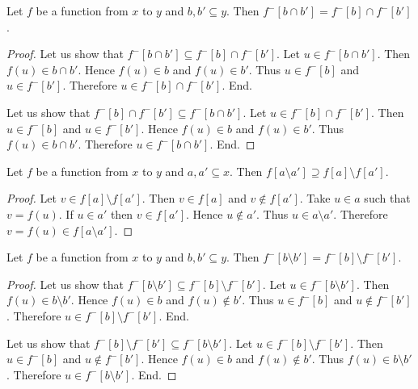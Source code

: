 \documentclass[../../sets-and-functions.ftl.tex]{subfiles}
\begin{document}
\begin{forthel}
    \begin{proposition}[SF 02 02 266480]
      Let $f$ be a function from $x$ to $y$ and $b,b' \subseteq y$.
      Then $f^{-}[b \cap b'] = f^{-}[b] \cap f^{-}[b']$.
    \end{proposition}
    \begin{proof}
      Let us show that $f^{-}[b \cap b'] \subseteq f^{-}[b] \cap f^{-}[b']$.
        Let $u \in f^{-}[b \cap b']$.
        Then $f(u) \in b \cap b'$.
        Hence $f(u) \in b$ and $f(u) \in b'$.
        Thus $u \in f^{-}[b]$ and $u \in f^{-}[b']$.
        Therefore $u \in f^{-}[b] \cap f^{-}[b']$.
      End.

      Let us show that $f^{-}[b] \cap f^{-}[b'] \subseteq f^{-}[b \cap b']$.
        Let $u \in f^{-}[b] \cap f^{-}[b']$.
        Then $u \in f^{-}[b]$ and $u \in f^{-}[b']$.
        Hence $f(u) \in b$ and $f(u) \in b'$.
        Thus $f(u) \in b \cap b'$.
        Therefore $u \in f^{-}[b \cap b']$.
      End.
    \end{proof}

    \begin{proposition}[SF 02 02 560446]
      Let $f$ be a function from $x$ to $y$ and $a,a' \subseteq x$.
      Then $f[a \setminus a'] \supseteq f[a] \setminus f[a']$.
    \end{proposition}
    \begin{proof}
      Let $v \in f[a] \setminus f[a']$.
      Then $v \in f[a]$ and $v \notin f[a']$.
      Take $u \in a$ such that $v = f(u)$.
      If $u \in a'$ then $v \in f[a']$.
      Hence $u \notin a'$.
      Thus $u \in a \setminus a'$.
      Therefore $v = f(u) \in f[a \setminus a']$.
    \end{proof}

    \begin{proposition}[SF 02 02 523450]
      Let $f$ be a function from $x$ to $y$ and $b,b' \subseteq y$.
      Then $f^{-}[b \setminus b'] = f^{-}[b] \setminus f^{-}[b']$.
    \end{proposition}
    \begin{proof}
      Let us show that $f^{-}[b \setminus b'] \subseteq f^{-}[b] \setminus f^{-}[b']$.
        Let $u \in f^{-}[b \setminus b']$.
        Then $f(u) \in b \setminus b'$.
        Hence $f(u) \in b$ and $f(u) \notin b'$.
        Thus $u \in f^{-}[b]$ and $u \notin f^{-}[b']$.
        Therefore $u \in f^{-}[b] \setminus f^{-}[b']$.
      End.

      Let us show that $f^{-}[b] \setminus f^{-}[b'] \subseteq f^{-}[b \setminus b']$.
        Let $u \in f^{-}[b] \setminus f^{-}[b']$.
        Then $u \in f^{-}[b]$ and $u \notin f^{-}[b']$.
        Hence $f(u) \in b$ and $f(u) \notin b'$.
        Thus $f(u) \in b \setminus b'$.
        Therefore $u \in f^{-}[b \setminus b']$.
      End.
    \end{proof}
  \end{forthel}
\end{document}
